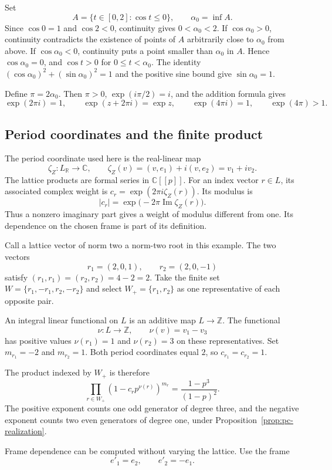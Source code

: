 Set
\[
 A=\{t\in[0,2]:\cos t\leq0\},\qquad \alpha_0=\inf A.
\]
Since $\cos0=1$ and $\cos2<0$, continuity gives $0<\alpha_0<2$.
If $\cos\alpha_0>0$, continuity contradicts the existence of points of $A$
arbitrarily close to $\alpha_0$ from above.
If $\cos\alpha_0<0$, continuity puts a point smaller than $\alpha_0$ in $A$.
Hence $\cos\alpha_0=0$, and $\cos t>0$ for $0\leq t<\alpha_0$.
The identity $(\cos\alpha_0)^2+(\sin\alpha_0)^2=1$ and the positive sine bound
give $\sin\alpha_0=1$.

Define $\pi=2\alpha_0$.
Then $\pi>0$, $\exp(i\pi/2)=i$, and the addition formula gives
\[
 \exp(2\pi i)=1,\qquad
 \exp(z+2\pi i)=\exp z,\qquad
 \exp(4\pi i)=1,\qquad \exp(4\pi)>1.
\]

\subsection{Period coordinates and the finite product}

The period coordinate used here is the real-linear map
\[
 \zeta_Z:L_{\mathbb R}\longrightarrow\mathbb C,
 \qquad \zeta_Z(v)=(v,e_1)+i(v,e_2)=v_1+iv_2.
\]
The lattice products are formal series in $\mathbb C[[p]]$.
For an index vector $r\in L$, its associated complex weight is
$c_r=\exp(2\pi i\zeta_Z(r))$.
Its modulus is
\[
 |c_r|=\exp\bigl(-2\pi\operatorname{Im}\zeta_Z(r)\bigr).
\]
Thus a nonzero imaginary part gives a weight of modulus different from
one. Its dependence on the chosen frame is part of its definition.

Call a lattice vector of norm two a norm-two root in this example.
The two vectors
\[
 r_1=(2,0,1),\qquad r_2=(2,0,-1)
\]
satisfy $(r_1,r_1)=(r_2,r_2)=4-2=2$.
Take the finite set $W=\{r_1,-r_1,r_2,-r_2\}$ and select
$W_+=\{r_1,r_2\}$ as one representative of each opposite pair.

An integral linear functional on $L$ is an additive map $L\to\mathbb Z$.
The functional
\[
 \nu:L\longrightarrow\mathbb Z,\qquad\nu(v)=v_1-v_3
\]
has positive values $\nu(r_1)=1$ and $\nu(r_2)=3$ on these representatives.
Set $m_{r_1}=-2$ and $m_{r_2}=1$.
Both period coordinates equal $2$, so $c_{r_1}=c_{r_2}=1$.

The product indexed by $W_+$ is therefore
\[
 \prod_{r\in W_+}(1-c_rp^{\nu(r)})^{m_r}
   =\frac{1-p^3}{(1-p)^2}.
\]
The positive exponent counts one odd generator of degree three, and the
negative exponent counts two even generators of degree one, under
Proposition~\ref{prop:pc-realization}.

Frame dependence can be computed without varying the lattice.
Use the frame
\[
 e'_1=e_2,\qquad e'_2=-e_1.
\]

